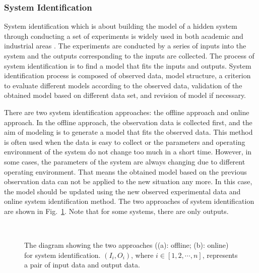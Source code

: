 \subsubsection{System Identification}

System identification which is about building the model of a hidden system through conducting a set of experiments is widely used in both academic and industrial areas \cite{Ljung_1999}. The experiments are conducted by a series of inputs into the system and the outputs corresponding to the inputs are collected. The process of system identification is to find a model that fits the inputs and outputs. System identification process is composed of observed data, model structure, a criterion to evaluate different models according to the observed data, validation of the obtained model based on different data set, and revision of model if necessary. 

There are two system identification approaches: the offline approach and online approach. In the offline approach, the observation data is collected first, and the aim of modeling is to generate a model that fits the observed data. This method is often used when the data is easy to collect or the parameters and operating environment of the system do not change too much in a short time. However, in some cases, the parameters of the system are always changing due to different operating environment. That means the obtained model based on the previous observation data can not be applied to the new situation any more. In this case, the model should be updated using the new observed experimental data and online system identification method. The two approaches of system identification are shown in Fig.~\ref{fig:modeling_approaches}. Note that for some systems, there are only outputs.
 
\begin{figure}[!t]
  \centering
  \\
  \caption{The diagram showing the two approaches ((a): offline; (b): online) for system identification. $(I_i, O_i)$, where $i \in [1, 2, \cdots, n]$, represents a pair of input data and output data.}
  \label{fig:modeling_approaches}
\end{figure}

